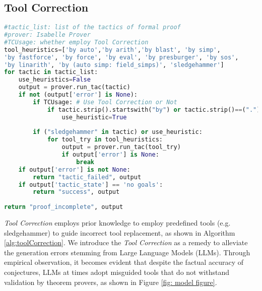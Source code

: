 \documentclass{article} \usepackage{iclr2024_conference,times}
\def\methodOneFull{\textit{Tool Correction}\xspace}
\begin{document}
\subsection{Tool Correction}
\begin{algorithm}[t]
\caption{Pseudocode of \methodOneFull in a Python-like style.}
\label{alg:toolCorrection}
\small








\begin{lstlisting}[language=python]
#tactic_list: list of the tactics of formal proof
#prover: Isabelle Prover 
#TCUsage: whether employ Tool Correction
tool_heuristics=['by auto','by arith','by blast', 'by simp',
'by fastforce', 'by force', 'by eval', 'by presburger', 'by sos',
'by linarith', 'by (auto simp: field_simps)', 'sledgehammer']
for tactic in tactic_list:
    use_heuristics=False
    output = prover.run_tac(tactic)
    if not (output['error'] is None):
        if TCUsage: # Use Tool Correction or Not
            if tactic.strip().startswith("by") or tactic.strip()==("."):
                use_heuristic=True
    
        if ("sledgehammer" in tactic) or use_heuristic:
            for tool_try in tool_heuristics:
                output = prover.run_tac(tool_try)
                if output['error'] is None:
                    break
    if output['error'] is not None:
        return "tactic_failed", output
    if output['tactic_state'] == 'no goals':
        return "success", output
        
return "proof_incomplete", output
\end{lstlisting}


\end{algorithm}

\methodOneFull employs prior knowledge to employ predefined tools (e.g. sledgehammer) to guide incorrect tool replacement, as shown in Algorithm \ref{alg:toolCorrection}. We introduce the \methodOneFull as a remedy to alleviate the generation errors stemming from Large Language Models (LLMs). Through empirical observation, it becomes evident that despite the factual accuracy of conjectures, LLMs at times adopt misguided tools that do not withstand validation by theorem provers, as shown in Figure \ref{fig: model figure}.
\end{document}
